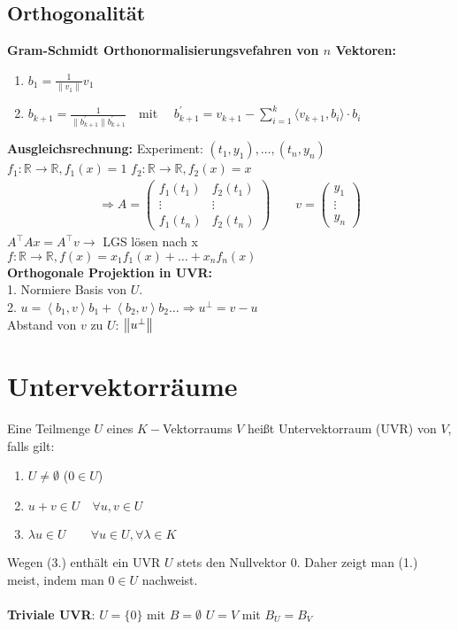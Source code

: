 \documentclass[7pt,a4paper]{scrartcl}
\newcommand{\norm}[2][\relax]{\ifx#1\relax \ensuremath{\left\Vert#2\right\Vert}\else \ensuremath{\left\Vert#2\right\Vert_{#1}}\fi}
\begin{document}
\begin{multicols}{3}
\subsection{Orthogonalität}
\textbf{Gram-Schmidt Orthonormalisierungsvefahren von $n$ Vektoren:}
\begin{enumerate}\itemsep0pt
	\item $b_1=\frac{1}{\|v_1\|}v_1$
	\item $b_{k+1}= \frac{1}{\|b_{k+1}^{'}\|b_{k+1}^{'}}$\ \ mit \ \ $b_{k+1}^{'}=v_{k+1}-\sum\limits_{i=1}^k \langle v_{k+1},b_i \rangle \cdot b_i$
\end{enumerate}
\textbf{Ausgleichsrechnung:} Experiment: $(t_1,y_1), \hdots, (t_n,y_n)$\\
$f_1: \mathbb R \rightarrow \mathbb R, f_1(x) =1$ \qquad $f_2: \mathbb R \rightarrow \mathbb R, f_2(x) = x$
\begin{eqnarray*}
	\Rightarrow A = \begin{pmatrix}f_1(t_1) & f_2(t_1)\\\vdots & \vdots\\f_1(t_n) & f_2(t_n)\end{pmatrix} \qquad v = \begin{pmatrix}y_1\\\vdots\\y_n\end{pmatrix}
\end{eqnarray*}
$A^{\top}Ax=A^{\top}v \rightarrow $ LGS lösen nach x\\
$f: \mathbb R \rightarrow \mathbb R, f(x) = x_1 f_1(x) + \hdots + x_n f_n(x)$
\\
\textbf{Orthogonale Projektion in UVR:} \quad \\
1. Normiere Basis von $U$. \\
2. $u = \left\langle b_1, v \right\rangle b_1 + \left\langle b_2, v \right\rangle b_2 \ldots \Rightarrow u^\perp = v - u$ \\
Abstand von $v$ zu $U$: $\norm{u^{\perp}}$

\section{Untervektorräume}
Eine Teilmenge $U$ eines $K-$Vektorraums $V$ heißt Untervektorraum (UVR) von $V$, falls gilt:
\begin{enumerate}\itemsep0pt
	\item $U\neq \emptyset$ \qquad ($0\in U$)
	\item $u+v\in U \quad \forall u,v\in U$
	\item $\lambda u \in U \qquad \forall u\in U,\forall \lambda \in K$
\end{enumerate}
Wegen (3.) enthält ein UVR $U$ stets den Nullvektor $0$. Daher zeigt man (1.) meist, indem man $0\in U$ nachweist.\\
\\
\textbf{Triviale UVR}: $U=\{0\}$ mit $B = \emptyset$ \qquad $U=V$ mit $B_U=B_V$


\end{multicols}
\end{document}
